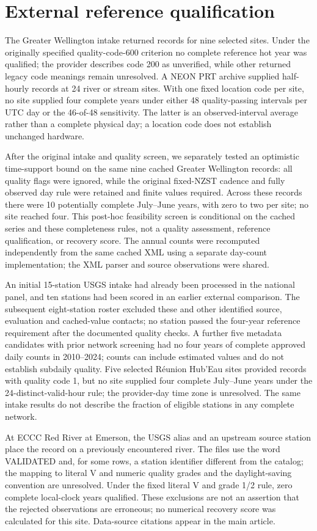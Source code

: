 \section{External reference qualification}
The Greater Wellington intake returned records for nine selected sites. Under the originally specified quality-code-600 criterion no complete reference hot year was qualified; the provider describes code 200 as unverified, while other returned legacy code meanings remain unresolved. A NEON PRT archive supplied half-hourly records at 24 river or stream sites. With one fixed location code per site, no site supplied four complete years under either 48 quality-passing intervals per UTC day or the 46-of-48 sensitivity. The latter is an observed-interval average rather than a complete physical day; a location code does not establish unchanged hardware.

After the original intake and quality screen, we separately tested an optimistic time-support bound on the same nine cached Greater Wellington records: all quality flags were ignored, while the original fixed-NZST cadence and fully observed day rule were retained and finite values required. Across these records there were 10 potentially complete July--June years, with zero to two per site; no site reached four. This post-hoc feasibility screen is conditional on the cached series and these completeness rules, not a quality assessment, reference qualification, or recovery score. The annual counts were recomputed independently from the same cached XML using a separate day-count implementation; the XML parser and source observations were shared.

An initial 15-station USGS intake had already been processed in the national panel, and ten stations had been scored in an earlier external comparison. The subsequent eight-station roster excluded these and other identified source, evaluation and cached-value contacts; no station passed the four-year reference requirement after the documented quality checks. A further five metadata candidates with prior network screening had no four years of complete approved daily counts in 2010--2024; counts can include estimated values and do not establish subdaily quality. Five selected R\'eunion Hub'Eau sites provided records with quality code 1, but no site supplied four complete July--June years under the 24-distinct-valid-hour rule; the provider-day time zone is unresolved. The same intake results do not describe the fraction of eligible stations in any complete network.

At ECCC Red River at Emerson, the USGS alias and an upstream source station place the record on a previously encountered river. The files use the word VALIDATED and, for some rows, a station identifier different from the catalog; the mapping to literal V and numeric quality grades and the daylight-saving convention are unresolved. Under the fixed literal V and grade 1/2 rule, zero complete local-clock years qualified. These exclusions are not an assertion that the rejected observations are erroneous; no numerical recovery score was calculated for this site. Data-source citations appear in the main article.
